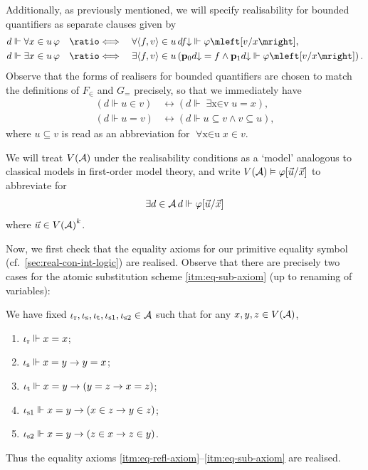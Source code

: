\documentclass[12pt,openany]{book}
\theoremstyle{plain}
\theoremstyle{definition}
\newcommand\uplabel[1]{\textup{(#1)}}
\newcommand\tuple[1]{\left\langle #1 \right\rangle}
\newcommand\opA[1]{\mathop{\forall #1}}
\newcommand\opE[1]{\mathop{\exists #1}}
\newcommand\defeqv{\quad \ratio\Longleftrightarrow \quad}
\newcommand\bp{\mathbf{p}}
\newcommand\ior{\iota_\textup{r}}
\newcommand\ios{\iota_\textup{s}}
\newcommand\iot{\iota_\textup{t}}
\newcommand\ioso{\iota_\textup{s1}}
\newcommand\iost{\iota_\textup{s2}}
\begin{document}
Additionally, as previously mentioned, we will specify realisability for bounded quantifiers as separate clauses given by
\begin{align*}
  d \Vdash \opA{x \in u} \varphi & \defeqv \opA{{\tuple{f, v} \in u}} df {\downarrow} \Vdash \varphi\mleft[v/x\mright],                                                  \\
  d \Vdash \opE{x \in u} \varphi & \defeqv \opE{{\tuple{f, v} \in u}} \left(\bp_0 d {\downarrow} = f \land \bp_1 d {\downarrow} \Vdash \varphi\mleft[v/x\mright]\right).
\end{align*}
Observe that the forms of realisers for bounded quantifiers are chosen to match the definitions of $F_\in$ and $G_=$ precisely, so that we immediately have
\begin{align*}
  \left(d \Vdash u \in v\right) & \leftrightarrow \left(d \Vdash \opE{x \in v} u = x\right),               \\
  \left(d \Vdash u = v\right)   & \leftrightarrow \left(d \Vdash u \subseteq v \land v \subseteq u\right),
\end{align*}
where $u \subseteq v$ is read as an abbreviation for $\opA{x \in u} x \in v$.

We will treat $V\mleft(\mathcal{A}\mright)$ under the realisability conditions as a `model' analogous to classical models in first-order model theory, and write $V\mleft(\mathcal{A}\mright) \vDash \varphi\mleft[\vec{u}/\vec{x}\mright]$ to abbreviate for
\[\opE{d \in \mathcal{A}} d \Vdash \varphi\mleft[\vec{u}/\vec{x}\mright]\]
where $\vec{u} \in V\mleft(\mathcal{A}\mright)^k$.

Now, we first check that the equality axioms for our primitive equality symbol (cf.\ \autoref{sec:real-con-int-logic}) are realised. Observe that there are precisely two cases for the atomic substitution scheme \ref{itm:eq-sub-axiom} (up to renaming of variables):
\begin{lemma}
  We have fixed $\ior, \ios, \iot, \ioso, \iost \in \mathcal{A}$ such that for any $x, y, z \in V\mleft(\mathcal{A}\mright)$,
  \begin{enumerate}[label=\uplabel{\roman*}]
    \item $\ior \Vdash x = x$;
    \item $\ios \Vdash x = y \rightarrow y = x$;
    \item $\iot \Vdash x = y \rightarrow \left(y = z \rightarrow x = z\right)$;
    \item $\ioso \Vdash x = y \rightarrow \left(x \in z \rightarrow y \in z\right)$;
    \item $\iost \Vdash x = y \rightarrow \left(z \in x \rightarrow z \in y\right)$.
  \end{enumerate}
  Thus the equality axioms \ref{itm:eq-refl-axiom}--\ref{itm:eq-sub-axiom} are realised.
\end{lemma}
\end{document}
